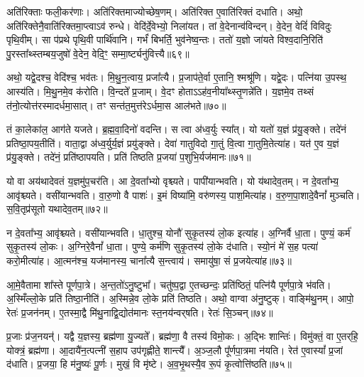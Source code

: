 अति॑रिक्ताः फली॒कर॑णाः।
अति॑रिक्तमाज्योच्छेष॒णम्।
अति॑रिक्त ए॒वाति॑रिक्तं दधाति।
अथो॒ अति॑रिक्तेनै॒वाति॑\-रिक्त\-मा॒प्त्वाऽव॑ रुन्धे।
वेदि॑र्दे॒वेभ्यो॒ निला॑यत।
तां वे॒देनान्व॑विन्दन्।
वे॒देन॒ वेदिं॑ विविदुः पृथि॒वीम्।
सा प॑प्रथे पृथि॒वी पार्थि॑वानि।
गर्भं॑ बिभर्ति॒ भुव॑नेष्व॒न्तः।
ततो॑ य॒ज्ञो जा॑यते विश्व॒दानि॒रिति॑ पु॒रस्ता᳚थ्स्तम्बय॒जुषो॑ वे॒देन॒ वेदि॒ꣳ॒ सम्मा॒र्ष्ट्यनु॑वित्त्यै॥६९॥

अथो॒ यद्वे॒दश्च॒ वेदि॑श्च॒ भव॑तः।
मि॒थु॒न॒त्वाय॒ प्रजा᳚त्यै।
प्र॒जा\-प॑ते॒र्वा ए॒तानि॒ श्मश्रू॑णि।
यद्वे॒दः।
पत्नि॑या उ॒पस्थ॒ आस्य॑ति।
मि॒थु॒नमे॒व क॑रोति।
वि॒न्दते᳚ प्र॒जाम्।
वे॒दꣳ होता\-ऽऽह॑व॒नीया᳚थ्स्तृ॒णन्ने॑ति।
य॒ज्ञमे॒व तथ्सं त॑नो॒त्योत्त॑रस्मादर्ध\-मा॒सात्।
तꣳ सन्त॑त॒मुत्त॑रे\-ऽर्धमा॒स आल॑भते॥७०॥

तं का॒लेका॑ल॒ आग॑ते यजते।
ब्र॒ह्म॒वा॒दिनो॑ वदन्ति।
स त्वा अ॑ध्व॒र्युः स्या᳚त्।
यो यतो॑ य॒ज्ञं प्र॑यु॒ङ्क्ते।
तदे॑नं प्रतिष्ठा॒पय॒तीति॑।
वाता॒द्वा अ॑ध्व॒र्युर्य॒ज्ञं प्रयु॑ङ्क्ते।
देवा॑ गातुविदो गा॒तुं वि॒त्वा गा॒तुमि॒तेत्या॑ह।
यत॑ ए॒व य॒ज्ञं प्र॑यु॒ङ्क्ते।
तदे॑नं॒ प्रति॑\-ष्ठापयति।
प्रति॑ तिष्ठति प्र॒जया॑ प॒शुभि॒र्यज॑मानः॥७१॥

यो वा अय॑थादेवतं य॒ज्ञमु॑प॒चर॑ति।
आ दे॒वता᳚भ्यो वृश्च्यते।
पापी॑यान्भवति।
यो य॑थादेव॒तम्।
न दे॒वता᳚भ्य॒ आवृ॑श्च्यते।
वसी॑यान्भवति।
वा॒रु॒णो वै पाशः॑।
इ॒मं विष्या॑मि॒ वरु॑णस्य॒ पाश॒मित्या॑ह।
व॒रु॒ण॒पा॒शादे॒वैनां᳚ मुञ्चति।
स॒वि॒तृप्र॑सूतो यथादेव॒तम्॥७२॥

न दे॒वता᳚भ्य॒ आवृ॑श्च्यते।
वसी॑यान्भवति।
धा॒तुश्च॒ योनौ॑ सुकृ॒तस्य॑ लो॒क इत्या॑ह।
अ॒ग्निर्वै धा॒ता।
पुण्यं॒ कर्म॑ सुकृ॒तस्य॑ लो॒कः।
अ॒ग्निरे॒वैनां᳚ धा॒ता।
पुण्ये॒ कर्म॑णि सुकृ॒तस्य॑ लो॒के द॑धाति।
स्यो॒नं मे॑ स॒ह पत्या॑ करो॒मीत्या॑ह।
आ॒त्मन॑श्च॒ यज॑मानस्य॒ चाना᳚त्यै स॒न्त्वाय॑।
समायु॑षा॒ सं प्र॒जयेत्या॑ह॥७३॥

आ॒\-मे॒वैतामा शा᳚स्ते पूर्णपा॒त्रे।
अ॒न्त॒तो॑\-ऽनु॒ष्टुभा᳚।
चतु॑ष्प॒द्वा ए॒तच्छन्दः॒ प्रति॑\-ष्ठितं॒ पत्नि॑यै पूर्णपा॒त्रे भ॑वति।
अ॒स्मिँल्लो॒के प्रति॑ तिष्ठा॒नीति॑।
अ॒स्मिन्ने॒व लो॒के प्रति॑ तिष्ठति।
अथो॒ वाग्वा अ॑नु॒ष्टुक्।
वाङ्मि॑थु॒नम्।
आपो॒ रेतः॑ प्र॒जन॑नम्।
ए॒तस्मा॒द्वै मि॑थु॒नाद्वि॒द्योत॑मानः स्त॒नय॑न्वर्‌\mbox{}षति।
रेतः॑ सि॒ञ्चन्॥७४॥

प्र॒जाः प्र॑ज॒नयन्॑।
यद्वै य॒ज्ञस्य॒ ब्रह्म॑णा यु॒ज्यते᳚।
ब्रह्म॑णा॒ वै तस्य॑ विमो॒कः।
अ॒द्भिः शान्तिः॑।
विमु॑क्तं॒ वा ए॒तर्‌\mbox{}हि॒ योक्त्रं॒ ब्रह्म॑णा।
आ॒दायै॑न॒त्पत्नी॑ स॒हाप उप॑गृह्णीते॒ शान्त्यै᳚।
अ॒ञ्ज॒लौ पू᳚र्णपा॒त्रमा न॑यति।
रेत॑ ए॒वास्यां᳚ प्र॒जां द॑धाति।
प्र॒जया॒ हि म॑नु॒ष्यः॑ पू॒र्णः।
मुखं॒ वि मृ॑ष्टे।
अ॒व॒भृ॒थस्यै॒व रू॒पं कृ॒त्वोत्ति॑ष्ठति॥७५॥\anuvakamend[स॒वि॒तृप्र॑सूतो यथादेव॒तं प्र॒जयेत्या॑ह सि॒ञ्चन्मृ॑ष्ट॒ एकं॑ च]

